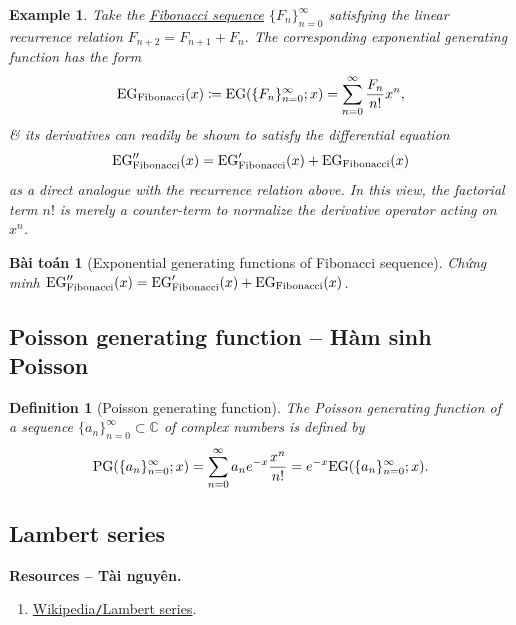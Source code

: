 \documentclass[oneside]{book}
\newtheorem{baitoan}{Bài toán}
\newtheorem{definition}{Definition}
\newtheorem{example}{Example}
\begin{document}
\begin{example}
	Take the \href{https://en.wikipedia.org/wiki/Fibonacci_sequence}{Fibonacci sequence} $\{F_n\}_{n=0}^\infty$ satisfying the linear recurrence relation $F_{n+2} = F_{n+1} + F_n$. The corresponding exponential generating function has the form
	\begin{equation*}
		{\rm EG}_{\rm Fibonacci}(x)\coloneqq{\rm EG}(\{F_n\}_{n=0}^\infty;x) = \sum_{n=0}^\infty \frac{F_n}{n!}x^n,
	\end{equation*}
	\& its derivatives can readily be shown to satisfy the differential equation
	\begin{equation*}
		{\rm EG}_{\rm Fibonacci}''(x) = {\rm EG}_{\rm Fibonacci}'(x) + {\rm EG}_{\rm Fibonacci}(x)
	\end{equation*}
	as a direct analogue with the recurrence relation above. In this view, the factorial term $n!$ is merely a counter-term to normalize the derivative operator acting on $x^n$.
\end{example}

\begin{baitoan}[Exponential generating functions of Fibonacci sequence]
	Chứng minh ${\rm EG}_{\rm Fibonacci}''(x) = {\rm EG}_{\rm Fibonacci}'(x) + {\rm EG}_{\rm Fibonacci}(x)$.
\end{baitoan}


\subsection{Poisson generating function -- Hàm sinh Poisson}

\begin{definition}[Poisson generating function]
	The {\rm Poisson generating function} of a sequence $\{a_n\}_{n=0}^\infty\subset\mathbb{C}$ of complex numbers is defined by
	\begin{equation}
		{\rm PG}(\{a_n\}_{n=0}^\infty;x) = \sum_{n=0}^\infty a_ne^{-x}\frac{x^n}{n!} = e^{-x}{\rm EG}(\{a_n\}_{n=0}^\infty;x).
	\end{equation}
\end{definition}


\subsection{Lambert series}
\textbf{\textbf{Resources -- Tài nguyên.}}
\begin{enumerate}
	\item \href{https://en.wikipedia.org/wiki/Lambert_series}{Wikipedia{\tt/}Lambert series}.
\end{enumerate}
\end{document}

